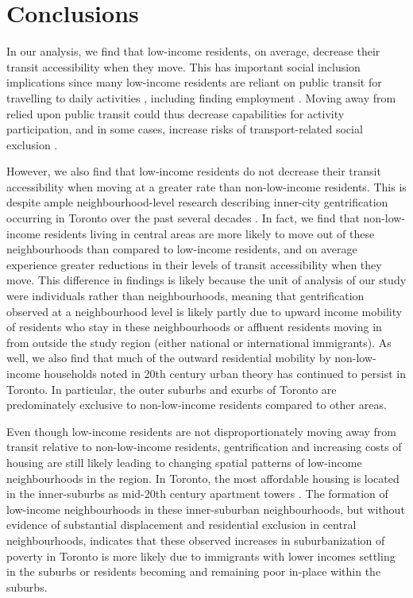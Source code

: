 \section{Conclusions}

In our analysis, we find that low-income residents, on average, decrease their transit accessibility when they move. This has important social inclusion implications since many low-income residents are reliant on public transit for travelling to daily activities \cite{allen_planning_2020,barri_can_2021}, including finding employment \cite{fransen_relationship_2019,bastiaanssen_does_2021}. Moving away from relied upon public transit could thus decrease capabilities for activity participation, and in some cases, increase risks of transport-related social exclusion \cite{lucas_transport_2012,allen_planning_2020}.

However, we also find that low-income residents do not decrease their transit accessibility when moving at a greater rate than non-low-income residents. This is despite ample neighbourhood-level research describing inner-city gentrification occurring in Toronto over the past several decades \cite{hulchanski_three_2010,walks_gentrification_2021}. In fact, we find that non-low-income residents living in central areas are more likely to move out of these neighbourhoods than compared to low-income residents, and on average experience greater reductions in their levels of transit accessibility when they move. This difference in findings is likely because the unit of analysis of our study were individuals rather than neighbourhoods, meaning that gentrification observed at a neighbourhood level is likely partly due to upward income mobility of residents who stay in these neighbourhoods or affluent residents moving in from outside the study region (either national or international immigrants). As well, we also find that much of the outward residential mobility by non-low-income households noted in 20th century urban theory \cite{burgess_growth_1925,alonso_location_1964} has continued to persist in Toronto. In particular, the outer suburbs and exurbs of Toronto are predominately exclusive to non-low-income residents compared to other areas. 

Even though low-income residents are not disproportionately moving away from transit relative to non-low-income residents, gentrification and increasing costs of housing are still likely leading to changing spatial patterns of low-income neighbourhoods in the region. In Toronto, the most affordable housing is located in the inner-suburbs as mid-20th century apartment towers \cite{skaburskis_filtering_2014,august_gentrification_2018}. The formation of low-income neighbourhoods in these inner-suburban neighbourhoods, but without evidence of substantial displacement and residential exclusion in central neighbourhoods, indicates that these observed increases in suburbanization of poverty in Toronto is more likely due to immigrants with lower incomes settling in the suburbs or residents becoming and remaining poor in-place within the suburbs.


